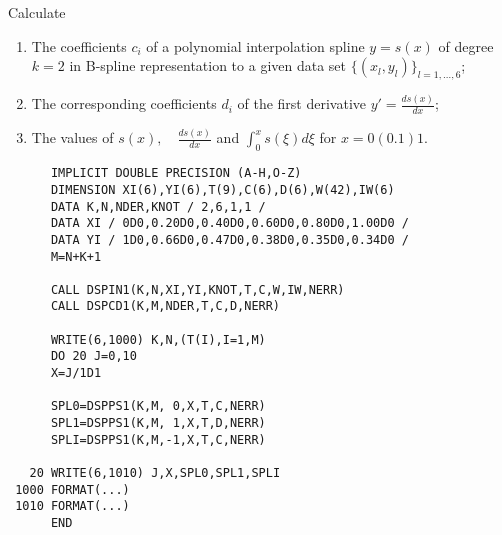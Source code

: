 \Examples
Calculate
\begin{enumerate}
\item
The coefficients $c_i$ of
a polynomial interpolation spline $y=s(x)$ of degree $k=2$ in B-spline
representation to a given data set $\{(x_l,y_l)\}_{l=1,\ldots,6}$;
\item
The corresponding coefficients $d_i$ of the first derivative \quad
$\displaystyle y'=$;
\item
The values of \quad $s(x), \quad \displaystyle {}$ \quad
and \quad $\displaystyle \int_0^x s(\xi)d\xi$ \quad for $x=0(0.1)1$.
\end{enumerate}
\begin{verbatim}
      IMPLICIT DOUBLE PRECISION (A-H,O-Z)
      DIMENSION XI(6),YI(6),T(9),C(6),D(6),W(42),IW(6)
      DATA K,N,NDER,KNOT / 2,6,1,1 /
      DATA XI / 0D0,0.20D0,0.40D0,0.60D0,0.80D0,1.00D0 /
      DATA YI / 1D0,0.66D0,0.47D0,0.38D0,0.35D0,0.34D0 /
      M=N+K+1

      CALL DSPIN1(K,N,XI,YI,KNOT,T,C,W,IW,NERR)
      CALL DSPCD1(K,M,NDER,T,C,D,NERR)

      WRITE(6,1000) K,N,(T(I),I=1,M)
      DO 20 J=0,10
      X=J/1D1

      SPL0=DSPPS1(K,M, 0,X,T,C,NERR)
      SPL1=DSPPS1(K,M, 1,X,T,D,NERR)
      SPLI=DSPPS1(K,M,-1,X,T,C,NERR)

   20 WRITE(6,1010) J,X,SPL0,SPL1,SPLI
 1000 FORMAT(...)
 1010 FORMAT(...)
      END
\end{verbatim}
